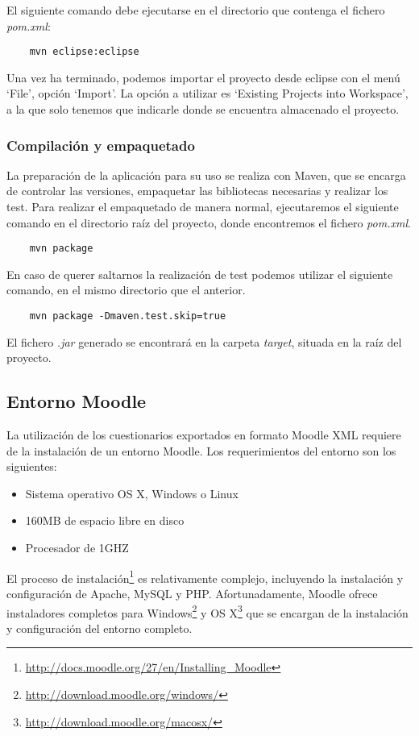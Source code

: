 El siguiente comando debe ejecutarse en el directorio que contenga el fichero \emph{pom.xml}:
\begin{verbatim}
	mvn eclipse:eclipse
\end{verbatim}
Una vez ha terminado, podemos importar el proyecto desde eclipse con el menú `File', opción `Import'.
La opción a utilizar es `Existing Projects into Workspace', a la que solo tenemos que indicarle donde se encuentra almacenado el proyecto.

\subsubsection{Compilación y empaquetado}
La preparación de la aplicación para su uso se realiza con Maven, que se encarga de controlar las versiones, empaquetar las bibliotecas necesarias y realizar los test.
Para realizar el empaquetado de manera normal, ejecutaremos el siguiente comando en el directorio raíz del proyecto, donde encontremos el fichero \emph{pom.xml}.
\begin{verbatim}
	mvn package
\end{verbatim}
En caso de querer saltarnos la realización de test podemos utilizar el siguiente comando, en el mismo directorio que el anterior.
\begin{verbatim}
	mvn package -Dmaven.test.skip=true
\end{verbatim}
El fichero \emph{.jar} generado se encontrará en la carpeta \emph{target}, situada en la raíz del proyecto.

\subsection{Entorno Moodle}
La utilización de los cuestionarios exportados en formato Moodle XML requiere de la instalación de un entorno Moodle.
Los requerimientos del entorno son los siguientes:
\begin{itemize}
	\item Sistema operativo OS X, Windows o Linux
	\item 160MB de espacio libre en disco
	\item Procesador de 1GHZ
\end{itemize}

El proceso de instalación\footnote{\url{http://docs.moodle.org/27/en/Installing\_Moodle}} es relativamente complejo, incluyendo la instalación y configuración de Apache, MySQL y PHP.
Afortunadamente, Moodle ofrece instaladores completos para Windows\footnote{\url{http://download.moodle.org/windows/}} y OS X\footnote{\url{http://download.moodle.org/macosx/}} que se encargan de la instalación y configuración del entorno completo.
